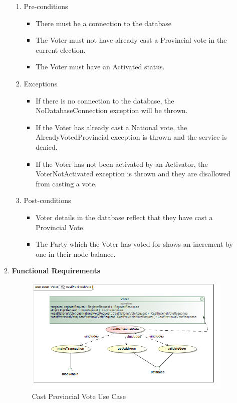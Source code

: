 \begin{enumerate}
\begin{enumerate}
		\begin{enumerate}
			\item Pre-conditions
			\begin{itemize}
				\item There must be a connection to the database
				\item The Voter must not have already cast a Provincial vote in the current election. 
				\item The Voter must have an Activated status.  
			\end{itemize}
			
			\item Exceptions
			\begin{itemize}
				\item If there is no connection to the database, the NoDatabaseConnection exception will be thrown.
				\item If the Voter has already cast a National vote, the AlreadyVotedProvincial exception is thrown and the service is denied.
				\item If the Voter has not been activated by an Activator, the VoterNotActivated exception is thrown and they are disallowed from casting a vote. 
			\end{itemize}
			
			\item Post-conditions
			\begin{itemize}
				\item Voter details in the database reflect that they have cast a Provincial Vote. 
				\item The Party which the Voter has voted for shows an increment by one in their node balance. 
			\end{itemize}
		\end{enumerate}
		\newpage
		\item \textbf{Functional Requirements}
		\begin{figure}[H]
			\centering
			\includegraphics[width=0.75\linewidth]{../Images/Voter/UseCases/castProvincialVote_useCase.png}
			\caption{Cast Provincial Vote Use Case}
		\end{figure}
		

\end{enumerate}
\end{enumerate}
